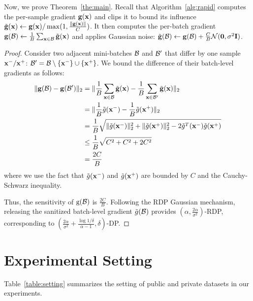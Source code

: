 Now, we prove Theorem~\ref{the:main}. Recall that Algorithm~\ref{alg:rapid} computes the per-sample gradient ${\mathbf{g}}({\mathbf{x}})$ and clips it to bound its influence $\tilde{{\mathbf{g}}}({\mathbf{x}}) \gets {\mathbf{g}}({\mathbf{x}}) / \max(1, \frac{\|{\mathbf{g}}({\mathbf{x}})\|}{C})$. It then computes the per-batch gradient 
${\mathbf{g}}({\mathcal{B}}) \leftarrow \frac{1}{B} \sum_{{\mathbf{x}} \in {\mathcal{B}}} \tilde{{\mathbf{g}}}({\mathbf{x}})$ and applies Gaussian noise:
$\tilde{{\mathbf{g}}}({\mathcal{B}}) \gets {\mathbf{g}}({\mathcal{B}})  + \frac{C}{B} {\mathcal{N}}(\mathbf{0}, \sigma^2 \mathbf{I})$.
\begin{proof}
Consider two adjacent mini-batches ${\mathcal{B}}$ and ${\mathcal{B}}'$ that differ by one sample ${\mathbf{x}}^-/{\mathbf{x}}^+$:
$ {\mathcal{B}}' = {\mathcal{B}}  \setminus  \{{\mathbf{x}}^-\} \cup \{{\mathbf{x}}^+\}$. We bound the difference of their batch-level gradients as follows: 
\begin{equation}
\begin{split}
\| {\mathbf{g}}({\mathcal{B}})  - {\mathbf{g}}({\mathcal{B}}')  \|_2  & =  
\| \frac{1}{B} \sum_{{\mathbf{x}} \in {\mathcal{B}}} \tilde{{\mathbf{g}}}({\mathbf{x}}) - \frac{1}{B} \sum_{{\mathbf{x}} \in {\mathcal{B}}'} \tilde{{\mathbf{g}}}({\mathbf{x}})\|_2
\\
& = \| \frac{1}{B}\tilde{g}({\mathbf{x}}^-) -  \frac{1}{B}\tilde{g}({\mathbf{x}}^+) \|_2 \\
& = \frac{1}{B} \sqrt{ 
\| \tilde{g}({\mathbf{x}}^-) \|^2_2  + \| \tilde{g}({\mathbf{x}}^+) \|^2_2 - 2 \tilde{g}^T({\mathbf{x}}^-) \tilde{g}({\mathbf{x}}^+)
}\\
& \leq \frac{1}{B} \sqrt{C^2 + C^2 + 2C^2} \\
& = \frac{2C}{B}
\end{split}
\end{equation}
where we use the fact that $\tilde{g}({\mathbf{x}}^-)$
and $\tilde{g}({\mathbf{x}}^+)$ are bounded by $C$ and the Cauchy-Schwarz inequality.

Thus, the sensitivity of ${\textnormal{g}}({\mathcal{B}})$ is $\frac{2C}{B}$. Following the RDP Gaussian mechanism, releasing the sanitized batch-level gradient $\tilde{g}({\mathcal{B}})$ provides $(\alpha, \frac{2\alpha}{\sigma^2})$-RDP, corresponding to 
$(\frac{2\alpha}{\sigma^2} + \frac{\log 1/\delta}{ \alpha -1}, \delta)$-DP.
\end{proof}



\section{Experimental Setting}
\label{sec:setting}

Table~\ref{table:setting} summarizes the setting of public and private datasets in our experiments.


